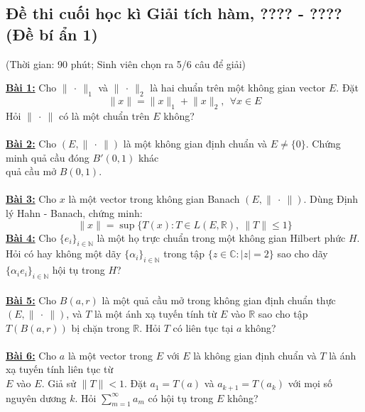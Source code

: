 \documentclass[10pt, a4paper]{article}
\begin{document}
\subsection{Đề thi cuối học kì Giải tích hàm, ???? - ???? (Đề bí ẩn 1)}
\begin{center}
	\color{blue}(Thời gian: 90 phút; Sinh viên chọn ra 5/6 câu để giải)
\end{center}
\color{red}\underline{\textbf{Bài 1:}} \color{black}Cho $\lVert~\cdot~\rVert_1$ và $\lVert~\cdot~\rVert_2$ là hai chuẩn trên một không gian vector $E$. Đặt $$\lVert x\rVert=\lVert x\rVert_1+\lVert x\rVert_2,~~\forall x\in E$$ Hỏi $\lVert~\cdot~\rVert$ có là một chuẩn trên $E$ không?\\\\
\color{red}\underline{\textbf{Bài 2:}} \color{black}Cho $(E,\lVert~\cdot~\rVert)$ là một không gian định chuẩn và $E\ne\{0\}$. Chứng minh quả cầu đóng $B'(0,1)$ khác\\ quả cầu mở $B(0,1)$.\\\\
\color{red}\underline{\textbf{Bài 3:}} \color{black}Cho $x$ là một vector trong không gian Banach $(E,\lVert~\cdot~\rVert)$. Dùng Định lý Hahn - Banach, chứng minh: $$\lVert x\rVert=\sup\{T(x):T\in L(E,\mathbb R),~\lVert T\rVert\le1\}$$
\color{red}\underline{\textbf{Bài 4:}} \color{black}Cho $\{e_i\}_{i\in\mathbb N}$ là một họ trực chuẩn trong một không gian Hilbert phức $H$. Hỏi có hay không một dãy $\{\alpha_i\}_{i\in\mathbb N}$ trong tập $\{z\in\mathbb C:|z|=2\}$ sao cho dãy $\{\alpha_ie_i\}_{i\in\mathbb N}$ hội tụ trong $H$?\\\\
\color{red}\underline{\textbf{Bài 5:}} \color{black}Cho $B(a,r)$ là một quả cầu mở trong không gian định chuẩn thực $(E,\lVert~\cdot~\rVert)$, và $T$ là một ánh xạ tuyến tính từ $E$ vào $\mathbb R$ sao cho tập $T(B(a,r))$ bị chặn trong $\mathbb R$. Hỏi $T$ có liên tục tại $a$ không?\\\\
\color{red}\underline{\textbf{Bài 6:}} \color{black}Cho $a$ là một vector trong $E$ với $E$ là không gian định chuẩn và $T$ là ánh xạ tuyến tính liên tục từ\\ $E$ vào $E$. Giả sử $\lVert T\rVert<1$. Đặt $a_1=T(a)$ và $a_{k+1}=T(a_k)$ với mọi số nguyên dương $k$. Hỏi $\sum_{m=1}^\infty a_m$ có hội tụ trong $E$ không?
\newpage
\end{document}
